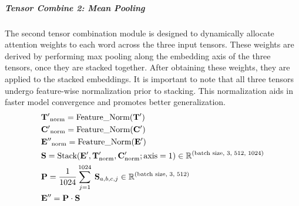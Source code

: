 \subparagraph*{Tensor Combine 2: Mean Pooling}
\label{subpar:3_mean_pooling}
The second tensor combination module is designed to dynamically allocate attention weights to each word across the three input tensors. These weights are derived by performing max pooling along the embedding axis of the three tensors, once they are stacked together. After obtaining these weights, they are applied to the stacked embeddings. It is important to note that all three tensors undergo feature-wise normalization prior to stacking. This normalization aids in faster model convergence and promotes better generalization.
\begin{equation} \label{eq:3_tensor_combine_linear_1}
    \begin{split}
        &\mathbf{T'}_{\text{norm}} = \text{Feature\_Norm}(\mathbf{T}')\\
        &\mathbf{C'}_{\text{norm}} = \text{Feature\_Norm}(\mathbf{C}')\\
        &\mathbf{E''}_{\text{norm}} = \text{Feature\_Norm}(\mathbf{E}')\\
        &\mathbf{S} = \text{Stack}(\mathbf{E}', \mathbf{T}'_{\text{norm}}, \mathbf{C}'_{\text{norm}}; \text{axis} = 1)\in \mathbb{R}^{{\small(\text{batch size, 3, 512, 1024})}}\\
        &\mathbf{P} = \frac{1}{1024}\sum_{j = 1}^{1024}\:\mathbf{S}_{a,b,c,j}\in \mathbb{R}^{{\small(\text{batch size, 3, 512})}}\\
        &\mathbf{E}'' = \mathbf{P}\cdot \mathbf{S}
    \end{split}
\end{equation}


